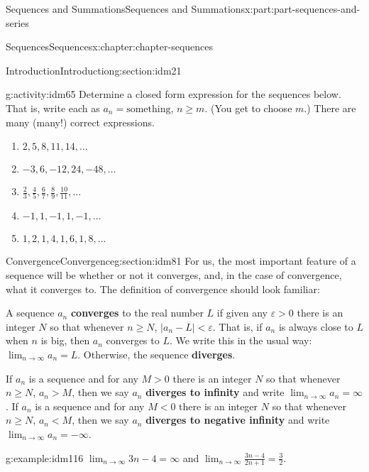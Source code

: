 \documentclass[oneside,10pt,]{book}
\newcommand{\terminology}[1]{\textbf{#1}}
\numberwithin{equation}{section}
\begin{document}
\begin{partptx}{Sequences and Summations}{}{Sequences and Summations}{}{}{x:part:part-sequences-and-series}
\begin{chapterptx}{Sequences}{}{Sequences}{}{}{x:chapter:chapter-sequences}
\begin{sectionptx}{Introduction}{}{Introduction}{}{}{g:section:idm21}
\begin{activity}{}{g:activity:idm65}%
Determine a closed form expression for the sequences below. That is, write each as \(a_n = \textrm{something}\), \(n \geq m\). (You get to choose \(m\).) There are many (many!) correct expressions.%
\begin{enumerate}[font=\bfseries,label=(\alph*),ref=\alph*]
\item{}\(2, 5, 8, 11, 14, \dots\)\item{}\(-3, 6, -12, 24, -48, \dots\)\item{}\(\frac{2}{3}, \frac{4}{5}, \frac{6}{7}, \frac{8}{9}, \frac{10}{11}, \dots\)\item{}\(-1, 1, -1, 1, -1, \dots\)\item{}\(1, 2, 1, 4, 1, 6, 1, 8, \dots\)\end{enumerate}
\end{activity}
\end{sectionptx}
%
%
\typeout{************************************************}
\typeout{************************************************}
%
\begin{sectionptx}{Convergence}{}{Convergence}{}{}{g:section:idm81}
For us, the most important feature of a sequence will be whether or not it converges, and, in the case of convergence, what it converges to. The definition of convergence should look familiar:%
\par
A sequence \(a_n\) \terminology{converges} to the real number \(L\) if given any \(\varepsilon > 0\) there is an integer \(N\) so that whenever \(n \geq N\), \(|a_n - L| < \varepsilon\). That is, if \(a_n\) is always close to \(L\) when \(n\) is big, then \(a_n\) converges to \(L\). We write this in the usual way: \(\displaystyle\lim_{n \to \infty}a_n = L\). Otherwise, the sequence \terminology{diverges}.%
\par
If \(a_n\) is a sequence and for any \(M > 0\) there is an integer \(N\) so that whenever \(n \geq N\), \(a_n > M\), then we say \(a_n\) \terminology{diverges to infinity} and write \(\displaystyle\lim_{n \to \infty}a_n = \infty\). If \(a_n\) is a sequence and for any \(M < 0\) there is an integer \(N\) so that whenever \(n \geq N\), \(a_n < M\), then we say \(a_n\) \terminology{diverges to negative infinity} and write \(\displaystyle\lim_{n \to \infty}a_n = -\infty\).%
\begin{example}{}{g:example:idm116}%
\(\displaystyle\lim_{n \to \infty} 3n-4 = \infty\) and \(\displaystyle\lim_{n \to \infty} \frac{3n-4}{2n+1} = \frac{3}{2}\).\end{example}

\end{sectionptx}
\end{chapterptx}
\end{partptx}
\end{document}
